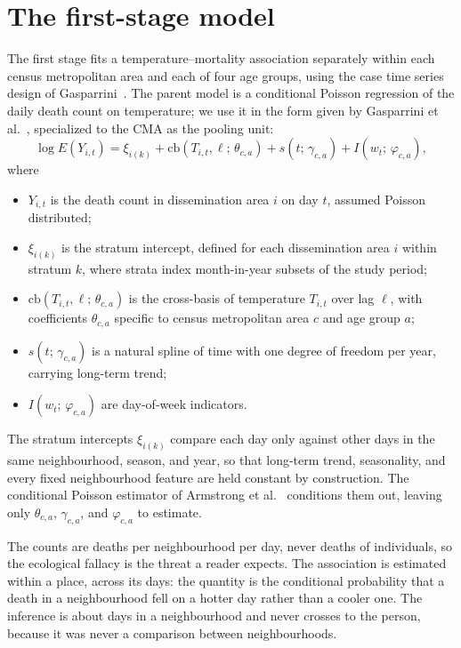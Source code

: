 \section{The first-stage model}
 
The first stage fits a temperature--mortality association separately within each census metropolitan area and each of four age groups, using the case time series design of Gasparrini~\citep{gasparrini2021}. The parent model is a conditional Poisson regression of the daily death count on temperature; we use it in the form given by Gasparrini et al.~\citep{gasparrini2022smallarea}, specialized to the CMA as the pooling unit:
%
\begin{equation}\label{eq_firststage}
\log E(Y_{i,t}) = \xi_{i(k)} + \mathrm{cb}(T_{i,t}, \ell;\, \theta_{c,a}) + s(t;\, \gamma_{c,a}) + I(w_{t};\, \varphi_{c,a}),
\end{equation}
%
where
\begin{itemize}
  \item $Y_{i,t}$ is the death count in dissemination area $i$ on day $t$, assumed Poisson distributed;
  \item $\xi_{i(k)}$ is the stratum intercept, defined for each dissemination area $i$ within stratum $k$, where strata index month-in-year subsets of the study period;
  \item $\mathrm{cb}(T_{i,t}, \ell;\, \theta_{c,a})$ is the cross-basis of temperature $T_{i,t}$ over lag $\ell$, with coefficients $\theta_{c,a}$ specific to census metropolitan area $c$ and age group $a$;
  \item $s(t;\, \gamma_{c,a})$ is a natural spline of time with one degree of freedom per year, carrying long-term trend;
  \item $I(w_{t};\, \varphi_{c,a})$ are day-of-week indicators.
\end{itemize}
 
The stratum intercepts $\xi_{i(k)}$ compare each day only against other days in the same neighbourhood, season, and year, so that long-term trend, seasonality, and every fixed neighbourhood feature are held constant by construction. The conditional Poisson estimator of Armstrong et al.~\citep{armstrong2014} conditions them out, leaving only $\theta_{c,a}$, $\gamma_{c,a}$, and $\varphi_{c,a}$ to estimate.

The counts are deaths per neighbourhood per day, never deaths of individuals, so the ecological fallacy is the threat a reader expects. The association is estimated within a place, across its days: the quantity is the conditional probability that a death in a neighbourhood fell on a hotter day rather than a cooler one. The inference is about days in a neighbourhood and never crosses to the person, because it was never a comparison between neighbourhoods.

